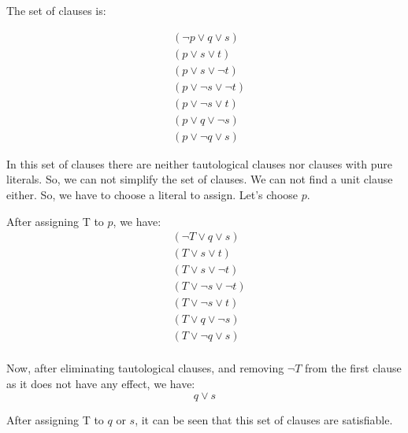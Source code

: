 \documentclass[12pt]{article}
\begin{document}
The set of clauses is:

\begin{align*}
    &(\neg p \vee q \vee s) \\
    &(p \vee s \vee t) \\
    &(p \vee s \vee \neg t) \\
    &(p \vee \neg s \vee \neg t) \\
    &(p \vee \neg s \vee t) \\
    &(p \vee q \vee \neg s) \\
    &(p \vee \neg q \vee s)
\end{align*}

In this set of clauses there are neither tautological clauses nor clauses with pure literals. So, we can not simplify the set of clauses. We can not find a unit clause either. So, we have to choose a literal to assign. Let's choose $p$.

After assigning T to $p$, we have:
\begin{align*}
    &(\neg T \vee q \vee s) \\
    &(T \vee s \vee t) \\
    &(T \vee s \vee \neg t) \\
    &(T \vee \neg s \vee \neg t) \\
    &(T \vee \neg s \vee t) \\
    &(T \vee q \vee \neg s) \\
    &(T \vee \neg q \vee s) \\
\end{align*}

Now, after eliminating tautological clauses, and removing $\neg T$ from the first clause as it does not have any effect, we have:
$$ q \vee s $$

After assigning T to $q$ or $s$, it can be seen that this set of clauses are satisfiable.
\end{document}
